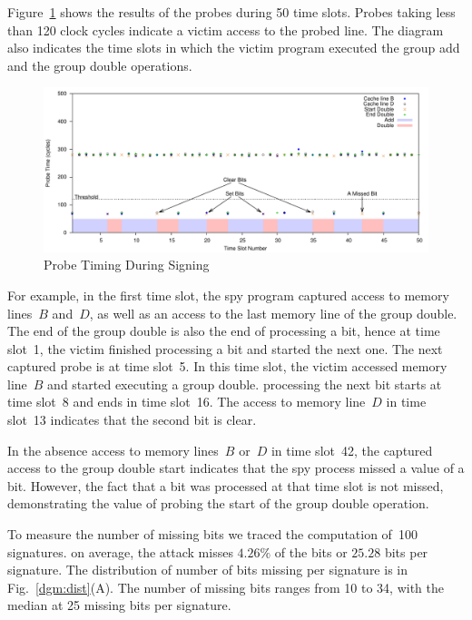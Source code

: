 \documentclass{llncs}
\begin{document}
Figure~\ref{dgm:timing} shows the results of the probes during 50 time slots.
Probes taking less than 120 clock cycles indicate a victim access to the probed line.
The diagram also indicates the time slots in which the victim program executed the group add and the group double operations.


\begin{figure}[htb]
\centering\includegraphics[width=\columnwidth]{images/timing}
\caption{Probe Timing During Signing\label{dgm:timing}}
\end{figure}

For example, in the first time slot, the spy program captured access to memory lines~$B$ and~$D$, as well as an access
to the last memory line of the group double.
The end of the group double is also the end of processing a bit, hence at time slot~1, the victim finished processing a bit
and started the next one.
The next captured probe is at time slot~5.
In this time slot, the victim accessed memory line~$B$ and started executing a group double.  
processing the next bit starts at time slot~8 and ends in time slot~16.
The access to memory line~$D$ in time slot~13 indicates that the second bit is clear.

In the absence access to memory lines~$B$ or~$D$ in time slot~42, the captured access to the group double start indicates
that the spy process missed a value of a bit.
However, the fact that a bit was processed at that time slot is not missed,
demonstrating the value of probing the start of the group double operation.

To measure the number of missing bits we traced the computation of~100 signatures.
on average, the attack misses $4.26\%$ of the bits or $25.28$ bits per signature.
The distribution of number of bits missing per signature is in Fig.~\ref{dgm:dist}(A).
The number of missing bits ranges from 10 to 34, with the median at 25 missing bits per signature.
\end{document}
